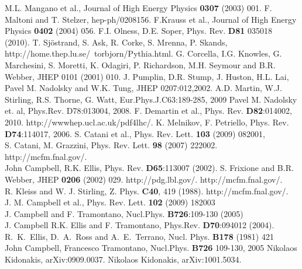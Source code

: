 \documentclass{cmspaper_pdf}
\begin{document}
\begin{thebibliography}{9}

 M.L. Mangano et al., Journal of High Energy Physics {\bf 0307} (2003) 001.
 F. Maltoni and T. Stelzer, hep-ph/0208156.
 F.Krauss et al., Journal of High Energy Physics {\bf 0402} (2004) 056.
 F.I. Olness, D.E. Soper, Phys. Rev. {\bf D81} 035018 (2010).
 T. Sj\"ostrand, S. Ask, R. Corke, S. Mrenna, 
P. Skands, http://home.thep.lu.se/~torbjorn/Pythia.html.
 G. Corcella, I.G. Knowles, G. Marchesini, 
S. Moretti, K. Odagiri, P. Richardson, M.H. Seymour and B.R. Webber, 
JHEP 0101 (2001) 010.
 J. Pumplin, D.R. Stump, J. Huston, H.L. Lai, 
Pavel M. Nadolsky and W.K. Tung, JHEP 0207:012,2002. 
 A.D. Martin, W.J. Stirling, R.S. Thorne, G. Watt, Eur.Phys.J.C63:189-285, 2009
 Pavel M. Nadolsky et. al, Phys.Rev. D78:013004, 2008. 
 F. Demartin et al., Phys. Rev. {\bf D82}:014002, 2010. 
 http://wwwhep.ucl.ac.uk/pdf4lhc/.
 K. Melnikov, F. Petriello, Phys. Rev. {\bf D74}:114017, 2006. 
 S. Catani et al., Phys. Rev. Lett. {\bf 103} (2009) 082001, \\
S. Catani, M. Grazzini, Phys. Rev. Lett. {\bf 98} (2007) 222002.
 http://mcfm.fnal.gov/. \\
John Campbell, R.K. Ellis, Phys. Rev. {\bf D65}:113007 (2002).
 S. Frixione and B.R. Webber, JHEP {\bf 0206} (2002) 029.
http://pdg.lbl.gov/.
 http://mcfm.fnal.gov/. \\
R. Kleiss and W. J. Stirling, Z. Phys. {\bf C40}, 419 (1988). 
 http://mcfm.fnal.gov/. \\
J. M. Campbell et al., Phys. Rev. Lett. {\bf 102} (2009) 182003\\
J. Campbell and F. Tramontano, Nucl.Phys. {\bf B726}:109-130 (2005) \\
J. Campbell R.K. Ellis and F. Tramontano, Phys.Rev. {\bf D70}:094012 (2004).
 R.~K.~Ellis, D.~A.~Ross and A.~E.~Terrano, Nucl. Phys. {\bf B178} (1981) 421 \\
John Campbell, Francesco Tramontano, Nucl.Phys. {\bf B726} 109-130, 2005
 Nikolaos Kidonakis, arXiv:0909.0037.
 Nikolaos Kidonakis, arXiv:1001.5034.

 
\end{thebibliography}
\end{document}
